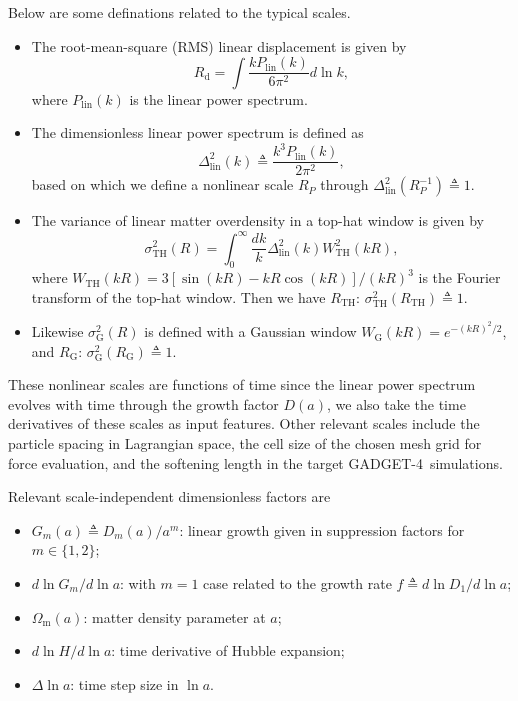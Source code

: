 \documentclass[modern, trackchanges, dvipsnames]{aastex631}
\newcommand{\GADGET}{{{\fontsize{10pt}{12pt}\selectfont GADGET}-4}}
\renewcommand{\d}{d}
\newcommand{\lna}{\ln\!a}
\newcommand{\lnk}{\ln\!k}
\newcommand{\Omegam}{\Omega_\mathrm{m}}
\newcommand{\linear}{\mathrm{lin}}
\newcommand{\tophat}{\mathrm{TH}}
\newcommand{\gauss}{\mathrm{G}}
\begin{document}
Below are some definations related to the typical scales.
\begin{itemize}
\item The root-mean-square (RMS) linear displacement is given by
%
\begin{equation}
R_\mathrm{d} = \int \frac{k P_\linear(k)}{6\pi^2} \d\lnk,
\end{equation}
%
where $P_\linear(k)$ is the linear power spectrum.
\item The dimensionless linear power spectrum is defined as
%
\begin{equation}
\Delta^2_\linear(k) \triangleq \frac{k^3 P_\linear(k)}{2 \pi^2},
\end{equation}
%
based on which we define a nonlinear scale $R_P$ through
$\Delta_\linear^2(R_P^{-1}) \triangleq 1$.
\item The variance of linear matter overdensity in a top-hat window is given by
%
\begin{equation}
\sigma_\tophat^2(R) = \int_0^\infty \frac{\d k}k
  \Delta_\linear^2(k) W_\tophat^2(kR),
\end{equation}
%
where $W_\tophat(kR) = 3[\sin(kR) - kR\cos(kR)] / (kR)^3$ is the
Fourier transform of the top-hat window.
Then we have $R_\tophat$: $\sigma_\tophat^2(R_\tophat) \triangleq 1$.
\item Likewise $\sigma_\gauss^2(R)$ is defined with a Gaussian window
$W_\gauss(kR) = e^{-(kR)^2/2}$, and $R_\gauss$: $\sigma_\gauss^2(R_\gauss)
\triangleq 1$.
\end{itemize}
These nonlinear scales are functions of time since the linear power spectrum
evolves with time through the growth factor $D(a)$, we also take the time
derivatives of these scales as input features.
Other relevant scales include the particle spacing in Lagrangian space, the cell
size of the chosen mesh grid for force evaluation, and the softening length in
the target \GADGET\ simulations.

Relevant scale-independent dimensionless factors are
\begin{itemize}
\item $G_m(a) \triangleq D_m(a) / a^m$: linear growth given in
  suppression factors for $m \in \{1, 2\}$;
\item $\d\ln G_m / \d\lna$: with $m=1$ case related to the growth rate
  $f \triangleq \d\ln D_1 / \d\lna$;
\item $\Omegam(a)$: matter density parameter at $a$;
\item $\d\ln\!H / \d\lna$: time derivative of Hubble expansion;
\item $\Delta\lna$: time step size in $\lna$.
\end{itemize}
\end{document}
